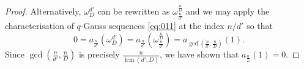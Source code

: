 \documentclass[10pt,a4paper]{amsart}
\begin{document}
\begin{proof}
Alternatively, $\omega_D^{d'}$ can be rewritten as $\omega_\frac{n}{d'}^\frac{n}{D}$ and we may apply the characterisation of $q$-Gauss sequences \eqref{eq:011} at the index $n/d'$ so that 
\[0=a_\frac{n}{d'}(\omega_D^{d'})=a_\frac{n}{d'}(\omega_\frac{n}{d'}^\frac{n}{D})=a_{\gcd(\frac{n}{d'},\frac{n}{D})}(1).\]
Since $\gcd(\frac{n}{d'},\frac{n}{D})$ is precisely $\frac{n}{\operatorname{lcm}(d',D)}$, we have shown that $a_\frac{n}{L}(1)=0$.
\end{proof}
\end{document}
